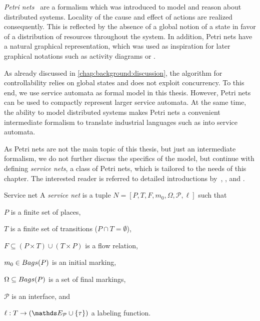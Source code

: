 \emph{Petri nets}~\cite{Reisig_1985,Murata_1989_pieee} are a formalism which was introduced to model and reason about distributed systems. Locality of the cause and effect of actions are realized consequently. This is reflected by the absence of a global notion of a state in favor of a distribution of resources throughout the system. In addition, Petri nets have a natural graphical representation, which was used as inspiration for later graphical notations such as  activity diagrams or .

As already discussed in \autoref{chap:background:discussion}, the algorithm for controllability relies on global states and does not exploit concurrency. To this end, we use service automata as formal model in this thesis. However, Petri nets can be used to compactly represent larger service automata. At the same time, the ability to model distributed systems makes Petri nets a convenient intermediate formalism to translate industrial languages such as  into service automata. 

As Petri nets are not the main topic of this thesis, but just an intermediate formalism, we do not further discuss the specifics of the model, but continue with defining \emph{service nets}, a class of Petri nets, which is tailored to the needs of this chapter. The interested reader is referred to detailed introductions by~\citet{Reisig_1985}, \citet{Murata_1989_pieee}, and \citet{DeselR_1996_pn}.

\begin{definition}{Service net}%
\label{def:servicenet}%
%
A \emph{service net} is a tuple $N=[P,T,F,m_0,\Omega,\mathcal{P},\ell]$ such that
\begin{myitemize}
\item $P$ is a finite set of places,
\item $T$ is a finite set of transitions ($P\cap T=\emptyset$),
\item $F\subseteq (P\times T) \cup (T\times P)$ is a flow relation,
\item $m_0\in \mathop{Bags}(P)$ is an initial marking,
\item $\Omega\subseteq \mathop{Bags}(P)$ is a set of final markings,
\item $\mathcal{P}$ is an interface, and
\item $\ell: T\rightarrow (\E_\mathcal{P}\cup\{\tau\})$ a labeling function.
\end{myitemize}
\end{definition}

